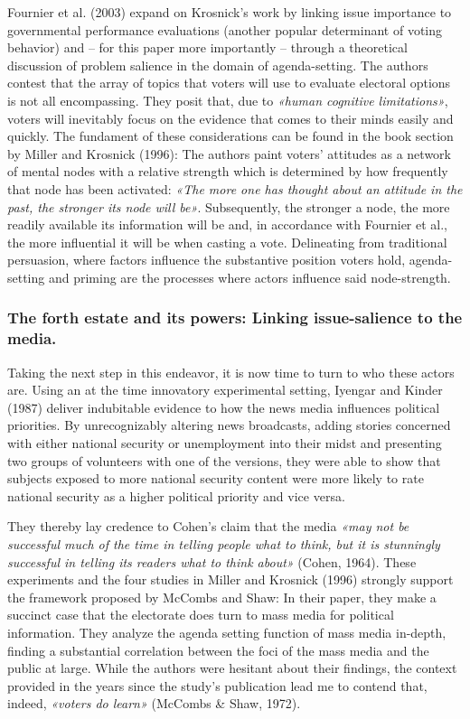 \documentclass[11pt,a4paper]{article}
\begin{document}
Fournier et al. (2003) expand on Krosnick’s work by linking issue importance to governmental performance evaluations (another popular determinant of voting behavior) and – for this paper more importantly – through a theoretical discussion of problem salience in the domain of agenda-setting. The authors contest that the array of topics that voters will use to evaluate electoral options is not all encompassing. They posit that, due to \textit{«human cognitive limitations»}, voters will inevitably focus on the evidence that comes to their minds easily and quickly. The fundament of these considerations can be found in the book section by Miller and Krosnick (1996): The authors paint voters’ attitudes as a network of mental nodes with a relative strength which is determined by how frequently that node has been activated: \textit{«The more one has thought about an attitude in the past, the stronger its node will be»}. Subsequently, the stronger a node, the more readily available its information will be and, in accordance with Fournier et al., the more influential it will be when casting a vote. Delineating from traditional persuasion, where factors influence the substantive position voters hold, agenda-setting and priming are the processes where actors influence said node-strength.

\subsubsection{The forth estate and its powers: Linking issue-salience to the media.}
Taking the next step in this endeavor, it is now time to turn to who these actors are. Using an at the time innovatory experimental setting, Iyengar and Kinder (1987) deliver indubitable evidence to how the news media influences political priorities. By unrecognizably altering news broadcasts, adding stories concerned with either national security or unemployment into their midst and presenting two groups of volunteers with one of the versions, they were able to show that subjects exposed to more national security content were more likely to rate national security as a higher political priority and vice versa. 

They thereby lay credence to Cohen’s claim that the media \textit{«may not be successful much of the time in telling people what to think, but it is stunningly successful in telling its readers what to think about»} (Cohen, 1964). These experiments and the four studies in Miller and Krosnick (1996) strongly support the framework proposed by McCombs and Shaw: In their paper, they make a succinct case that the electorate does turn to mass media for political information. They analyze the agenda setting function of mass media in-depth, finding a substantial correlation between the foci of the mass media and the public at large. While the authors were hesitant about their findings, the context provided in the years since the study’s publication lead me to contend that, indeed, \textit{«voters do learn»} (McCombs \& Shaw, 1972).
\end{document}
